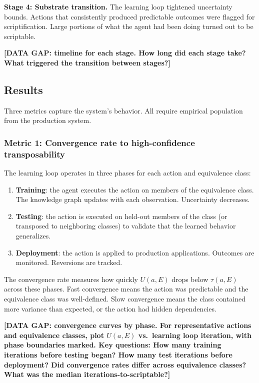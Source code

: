 \documentclass[11pt]{article}
\theoremstyle{definition}
\begin{document}
\textbf{Stage 4: Substrate transition.} The learning loop tightened
uncertainty bounds. Actions that consistently produced predictable
outcomes were flagged for scriptification. Large portions of what the
agent had been doing turned out to be scriptable.

\textbf{[DATA GAP: timeline for each stage. How long did each stage
take? What triggered the transition between stages?]}

\subsection{Results}

Three metrics capture the system's behavior. All require empirical
population from the production system.

\subsubsection{Metric 1: Convergence rate to high-confidence
transposability}

The learning loop operates in three phases for each action and
equivalence class:

\begin{enumerate}
\item \textbf{Training}: the agent executes the action on members of
   the equivalence class. The knowledge graph updates with each
   observation. Uncertainty decreases.
\item \textbf{Testing}: the action is executed on held-out members of
   the class (or transposed to neighboring classes) to validate that
   the learned behavior generalizes.
\item \textbf{Deployment}: the action is applied to production
   applications. Outcomes are monitored. Reversions are tracked.
\end{enumerate}

The convergence rate measures how quickly $U(a, E)$ drops below
$\tau(a, E)$ across these phases. Fast convergence means the action
was predictable and the equivalence class was well-defined. Slow
convergence means the class contained more variance than expected, or
the action had hidden dependencies.

\textbf{[DATA GAP: convergence curves by phase. For representative
actions and equivalence classes, plot $U(a, E)$ vs.\ learning loop
iteration, with phase boundaries marked. Key questions: How many
training iterations before testing began? How many test iterations
before deployment? Did convergence rates differ across equivalence
classes? What was the median iterations-to-scriptable?]}
\end{document}
